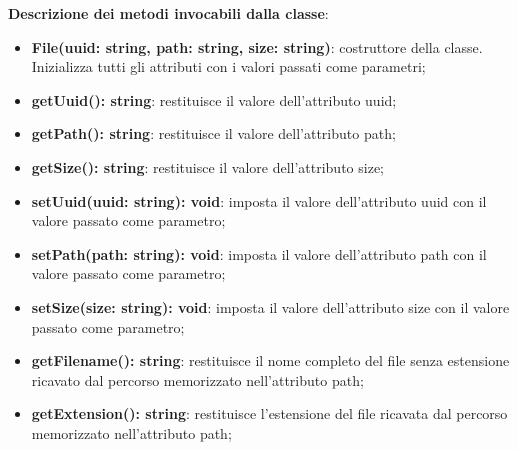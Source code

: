 \documentclass[a4paper,12pt]{article}
\begin{document}
{{{              \noindent \textbf{Descrizione dei metodi invocabili dalla classe}:
                \begin{itemize}
                    \item \textbf{File(uuid: string, path: string, size: string)}: costruttore della classe. Inizializza tutti gli attributi con i valori passati come parametri;
                    \item \textbf{getUuid(): string}: restituisce il valore dell'attributo uuid;
                    \item \textbf{getPath(): string}: restituisce il valore dell'attributo path;
                    \item \textbf{getSize(): string}: restituisce il valore dell'attributo size;
                    \item \textbf{setUuid(uuid: string): void}: imposta il valore dell'attributo uuid con il valore passato come parametro;
                    \item \textbf{setPath(path: string): void}: imposta il valore dell'attributo path con il valore passato come parametro;
                    \item \textbf{setSize(size: string): void}: imposta il valore dell'attributo size con il valore passato come parametro;
                    \item \textbf{getFilename(): string}: restituisce il nome completo del file senza estensione ricavato dal percorso memorizzato nell'attributo path;
                    \item \textbf{getExtension(): string}: restituisce l'estensione del file ricavata dal percorso memorizzato nell'attributo path;
                \end{itemize}
}}}
\end{document}
